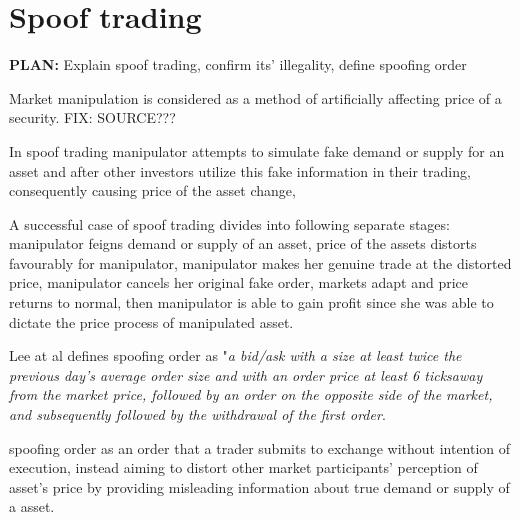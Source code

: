 \documentclass{tut-thesis}
\begin{document}

\section{Spoof trading}
\textbf{PLAN:} Explain spoof trading, confirm its' illegality, define spoofing order

Market manipulation is considered as a method of artificially affecting price of a security. FIX: SOURCE???


\autocite{KyleViswanathan2008}

In spoof trading manipulator attempts to simulate fake demand or supply for an asset and after other investors utilize this fake information in their trading, consequently causing price of the asset change, 

A successful case of spoof trading divides into following separate stages: manipulator feigns demand or supply of an asset, price of the assets distorts favourably for manipulator, manipulator makes her genuine trade at the distorted price, manipulator cancels her original fake order, markets adapt and price returns to normal, then manipulator is able to gain profit since she was able to dictate the price process of manipulated asset.

Lee at al \parencite*{} defines spoofing order as "\textit{a bid/ask with a size at least twice the previous day’s average order size and with an order price at least 6 ticks\footnotemark away from the market price, followed by an order on the opposite side of the market, and subsequently followed by the withdrawal of the first order}.


spoofing order as an order that a trader submits to exchange without intention of execution, instead aiming to distort other market participants' perception of asset's price by providing misleading information about true demand or supply of a asset. 
\end{document}
